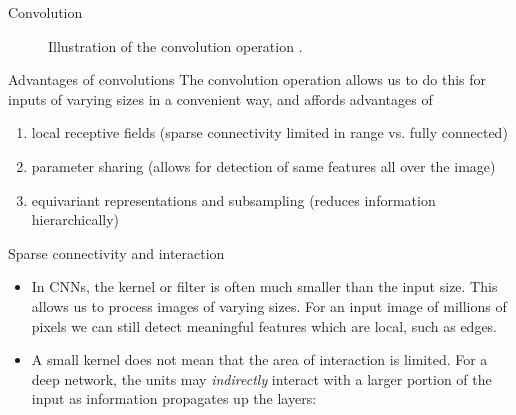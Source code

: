 \documentclass{beamer}
\begin{document}
\begin{frame}{Convolution}
\begin{figure}
            \caption{Illustration of the convolution operation \cite{dumoulin2016guide}.}
        \end{figure}
    \end{frame}
		
		\begin{frame}{Advantages of convolutions}
	The convolution operation allows us to do this for inputs of varying sizes in a convenient way, and affords advantages of  %
	\begin{enumerate}
	\item local receptive fields (sparse connectivity limited in range vs. fully connected) %
	\item parameter sharing (allows for detection of same features all over the image) %
	\item equivariant representations and subsampling (reduces information hierarchically)
	\end{enumerate}
	\end{frame}


	\begin{frame}{Sparse connectivity and interaction}
	\footnotesize
	\begin{itemize}
		\item In CNNs, the kernel or filter is often much smaller than the input size.  This allows us to process images of varying sizes.  For an input image of millions of pixels we can still detect meaningful features which are local, such as edges. 
		\item A small kernel does not mean that the area of interaction is limited.  For a deep network, the units may \emph{indirectly} interact with a larger portion of the input as information propagates up the layers:
	\end{itemize}
	\end{frame}
\end{document}

